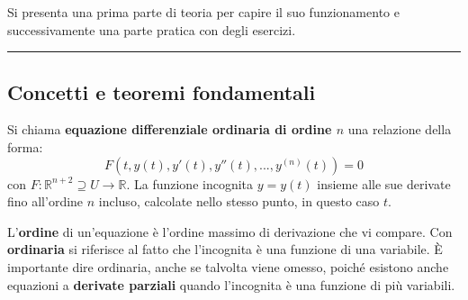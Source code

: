 \documentclass[a4paper]{article}
\newcommand{\longline}{\noindent\rule{\textwidth}{0.4pt}}
\newcommand{\definition}[1]{\textcolor{Red3}{\textbf{#1}}}
\begin{document}
	Si presenta una prima parte di teoria per capire il suo funzionamento e successivamente una parte pratica con degli esercizi.
	
	\longline

	\subsection{Concetti e teoremi fondamentali}\label{subsection: concetti e teoremi fondamentali (eq. diff. ordinarie)}

	Si chiama \definition{equazione differenziale ordinaria di ordine $n$} una relazione della forma:
	\begin{equation}\label{eq: equazione differenziale ordinaria di ordine n}
		F(t, y\left(t\right), y'\left(t\right), y''\left(t\right), ..., y^{\left(n\right)}\left(t\right)) = 0
	\end{equation}
	con $F: \mathbb{R}^{n+2} \supseteq U \rightarrow \mathbb{R}$. La funzione incognita $y=y\left(t\right)$ insieme alle sue derivate fino all'ordine $n$ incluso, calcolate nello stesso punto, in questo caso $t$.\newline

	\noindent
	L'\definition{ordine} di un'equazione è l'ordine massimo di derivazione che vi compare. Con \definition{ordinaria} si riferisce al fatto che l'incognita è una funzione di una variabile. È importante dire ordinaria, anche se talvolta viene omesso, poiché esistono anche equazioni a \definition{derivate parziali} quando l'incognita è una funzione di più variabili.\newline
\end{document}
